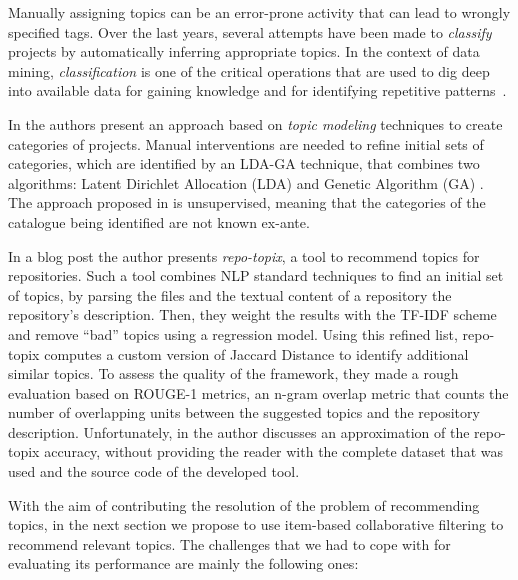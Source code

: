Manually assigning topics can be an error-prone activity that can lead to 
wrongly specified tags. Over the last years, several attempts have been 
made to \textit{classify} \GH projects by automatically inferring 
appropriate topics. In the context of data mining, \textit{classification} is 
one of the critical operations that are used to dig deep into available data 
for gaining knowledge and for identifying repetitive 
patterns~\cite{kotsiantis2007supervised}. 

In \cite{davidlo1} the authors present an approach based on \textit{topic 
modeling} techniques to create categories of \GH projects. Manual interventions 
are needed to refine initial sets of categories, which are identified by an 
LDA-GA technique, that combines two algorithms: Latent Dirichlet Allocation 
(LDA) and Genetic Algorithm (GA) \cite{6606598}. The approach proposed in  
\cite{davidlo1}  is unsupervised, meaning that the categories of the catalogue 
being identified are not known ex-ante. 

In a \GH blog post \cite{noauthor_topic_nodate} the author presents 
\textit{repo-topix}, a tool to recommend topics for \GH repositories. Such a 
tool combines NLP standard techniques to 
find an initial set of topics, by parsing the \RM files and the textual content 
of a repository \eg the repository's description. Then, they weight the results 
with the TF-IDF scheme and remove ``bad'' topics using a regression model. Using 
this refined list, repo-topix computes a custom version of Jaccard Distance to 
identify additional similar topics. To assess the quality of the framework, 
they made a rough evaluation based on  ROUGE-1 metrics, an n-gram overlap 
metric that counts the number of overlapping units between the suggested topics 
and the repository description. Unfortunately, in \cite{noauthor_topic_nodate} 
the author discusses an approximation of the repo-topix accuracy, without 
providing the reader with the complete dataset that was used and the source 
code of the developed tool. 

\smallskip

With the aim of contributing the resolution of the problem of recommending \GH 
topics, in the next section we propose to use item-based collaborative filtering to recommend relevant topics. The  
challenges that we had to cope with for evaluating its performance are mainly 
the following ones:

